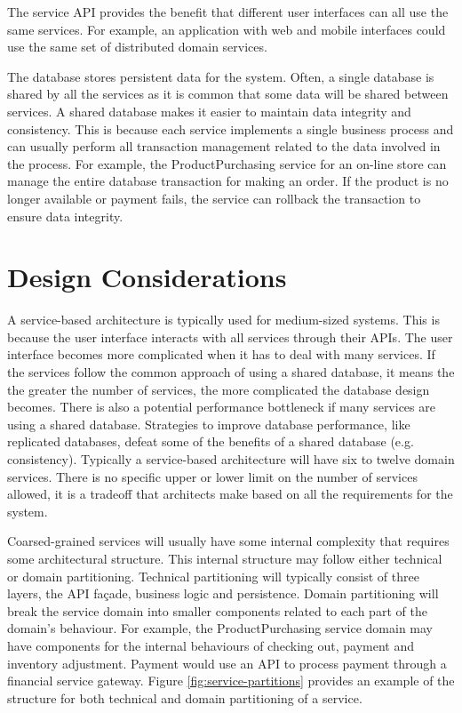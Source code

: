 The service API provides the benefit that different user interfaces can all use the same services.
For example, an application with web and mobile interfaces could use the same set of distributed domain services.

The database stores persistent data for the system.
Often, a single database is shared by all the services as it is common that some data will be shared between services.
A shared database makes it easier to maintain data integrity and consistency.
This is because each service implements a single business process
and can usually perform all transaction management related to the data involved in the process.
For example, the ProductPurchasing service for an on-line store can manage the entire database transaction for making an order.
If the product is no longer available or payment fails, the service can rollback the transaction to ensure data integrity.


\section{Design Considerations}\label{sec:design-considerations}

A service-based architecture is typically used for medium-sized systems.
This is because the user interface interacts with all services through their APIs.
The user interface becomes more complicated when it has to deal with many services.
If the services follow the common approach of using a shared database,
it means the the greater the number of services, the more complicated the database design becomes.
There is also a potential performance bottleneck if many services are using a shared database.
Strategies to improve database performance, like replicated databases, defeat some of the benefits of a shared database (e.g. consistency).
Typically a service-based architecture will have six to twelve domain services.
There is no specific upper or lower limit on the number of services allowed,
it is a tradeoff that architects make based on all the requirements for the system.

Coarsed-grained services will usually have some internal complexity that requires some architectural structure.
This internal structure may follow either technical or domain partitioning.
Technical partitioning will typically consist of three layers, the API façade, business logic and persistence.
Domain partitioning will break the service domain into smaller components related to each part of the domain's behaviour.
For example, the ProductPurchasing service domain may have components for the internal behaviours of checking out,
payment and inventory adjustment. Payment would use an API to process payment through a financial service gateway.
Figure \ref{fig:service-partitions} provides an example of the structure for both technical and domain partitioning of a service.

